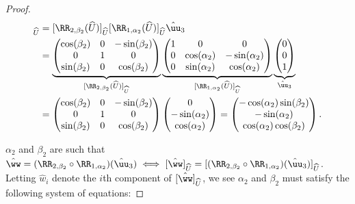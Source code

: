 \begin{proof}
    \begin{align*}
        [(\RR_{2, \beta_2} \circ \RR_{1, \alpha_2})(\huu_3)]_{\hU} &=
        [\RR_{2, \beta_2}(\hU)]_{\hU} [\RR_{1, \alpha_2}(\hU)]_{\hU} \huu_3 \\
        &=
        \underbrace
        {
            \begin{pmatrix}
                \cos(\beta_2) & 0 & -\sin(\beta_2) \\
                0 & 1 & 0 \\
                \sin(\beta_2) & 0 & \cos(\beta_2)
            \end{pmatrix}
        }_{[\RR_{2, \beta_2}(\hU)]_{\hU}}
        \underbrace
        {
            \begin{pmatrix}
                1 & 0 & 0 \\
                0 & \cos(\alpha_2) & -\sin(\alpha_2) \\
                0 & \sin(\alpha_2) & \cos(\alpha_2)
            \end{pmatrix}
        }_{[\RR_{1, \alpha_2}(\hU)]_{\hU}}
        \underbrace
        {
            \begin{pmatrix}
                0 \\ 0 \\ 1
            \end{pmatrix}
        }_{\huu_3} \\
        &=
        \begin{pmatrix}
            \cos(\beta_2) & 0 & -\sin(\beta_2) \\
            0 & 1 & 0 \\
            \sin(\beta_2) & 0 & \cos(\beta_2)
        \end{pmatrix}
        \begin{pmatrix}
            0 \\
            -\sin(\alpha_2) \\
            \cos(\alpha_2)
        \end{pmatrix}
        =
        \begin{pmatrix}
            -\cos(\alpha_2) \sin(\beta_2) \\
            -\sin(\alpha_2) \\
            \cos(\alpha_2) \cos(\beta_2)
        \end{pmatrix}.
    \end{align*}

    \newcommand{\hw}{\hat{w}}

    $\alpha_2$ and $\beta_2$ are such that $\hww = (\RR_{2, \beta_2} \circ \RR_{1, \alpha_2})(\huu_3) \iff [\hww]_{\hU} = [(\RR_{2, \beta_2} \circ \RR_{1, \alpha_2})(\huu_3)]_{\hU}$. Letting $\hw_i$ denote the $i$th component of $[\hww]_{\hU}$, we see $\alpha_2$ and $\beta_2$ must satisfy the following system of equations:


\end{proof}

